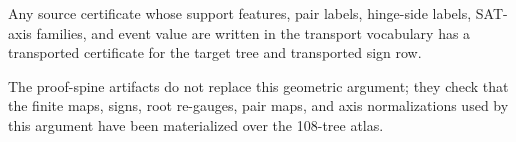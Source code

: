 \begin{corollary}
Any source certificate whose support features, pair labels, hinge-side labels, SAT-axis families, and event value are written in the transport vocabulary has a transported certificate for the target tree and transported sign row.
\end{corollary}

The proof-spine artifacts do not replace this geometric argument; they check that the finite maps, signs, root re-gauges, pair maps, and axis normalizations used by this argument have been materialized over the 108-tree atlas.
